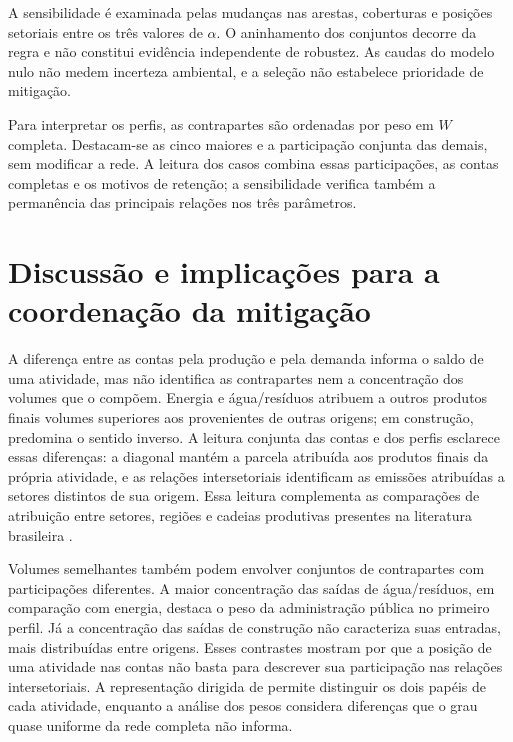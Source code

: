 \documentclass[11pt]{article}
\begin{document}
A sensibilidade é examinada pelas mudanças nas arestas, coberturas e posições setoriais entre os três valores de $\alpha$. O aninhamento dos conjuntos decorre da regra e não constitui evidência independente de robustez. As caudas do modelo nulo não medem incerteza ambiental, e a seleção não estabelece prioridade de mitigação.

Para interpretar os perfis, as contrapartes são ordenadas por peso em $W$ completa. Destacam-se as cinco maiores e a participação conjunta das demais, sem modificar a rede. A leitura dos casos combina essas participações, as contas completas e os motivos de retenção; a sensibilidade verifica também a permanência das principais relações nos três parâmetros.

\clearpage

\clearpage
\section{Discussão e implicações para a coordenação da mitigação}

A diferença entre as contas pela produção e pela demanda informa o saldo de uma atividade, mas não identifica as contrapartes nem a concentração dos volumes que o compõem. Energia e água/resíduos atribuem a outros produtos finais volumes superiores aos provenientes de outras origens; em construção, predomina o sentido inverso. A leitura conjunta das contas e dos perfis esclarece essas diferenças: a diagonal mantém a parcela atribuída aos produtos finais da própria atividade, e as relações intersetoriais identificam as emissões atribuídas a setores distintos de sua origem. Essa leitura complementa as comparações de atribuição entre setores, regiões e cadeias produtivas presentes na literatura brasileira \parencite{imori2015,sanguinetAzzoni2024,montoyaEtAl2026}.

Volumes semelhantes também podem envolver conjuntos de contrapartes com participações diferentes. A maior concentração das saídas de água/resíduos, em comparação com energia, destaca o peso da administração pública no primeiro perfil. Já a concentração das saídas de construção não caracteriza suas entradas, mais distribuídas entre origens. Esses contrastes mostram por que a posição de uma atividade nas contas não basta para descrever sua participação nas relações intersetoriais. A representação dirigida de \textcite{huang2019} permite distinguir os dois papéis de cada atividade, enquanto a análise dos pesos considera diferenças que o grau quase uniforme da rede completa não informa.
\end{document}
